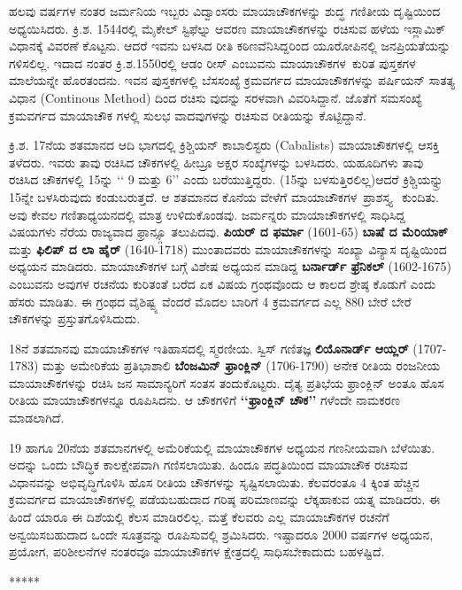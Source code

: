 \medskip
ಹಲವು ವರ್ಷಗಳ ನಂತರ ಜರ್ಮನಿಯ ಇಬ್ಬರು ವಿದ್ವಾಂಸರು ಮಾಯಾಚೌಕಗಳನ್ನು \hbox{ಶುದ್ಧ ಗಣಿತೀಯ} ದೃಷ್ಟಿಯಿಂದ ಅಧ್ಯಯಿಸಿದರು. ಕ್ರಿ.ಶ. 1544ರಲ್ಲಿ ಮೈಕೇಲ್ ಸ್ಟಿಫೆಲ್ನು ಆವರಣ ಮಾಯಾಚೌಕಗಳನ್ನು ರಚಿಸುವ ಹಳೆಯ ಇಸ್ಲಾಮಿಕ್ ವಿಧಾನಕ್ಕೆ ವಿವರಣೆ ಕೊಟ್ಟನು. ಆದರೆ ಇವನು ಬಳಸಿದ ರೀತಿ ಕಠಿಣವೆನಿಸಿದ್ದರಿಂದ ಯೂರೋಪಿನಲ್ಲಿ ಜನಪ್ರಿಯತೆಯನ್ನು ಗಳಿಸ\-ಲಿಲ್ಲ. ಇದಾದ ನಂತರ ಕ್ರಿ.ಶ.1550ರಲ್ಲಿ ಆಡಂ ರೀಸ್ ಎಂಬುವನು \hbox{ಮಾಯಾಚೌಕಗಳ ಕುರಿತ} ಪುಸ್ತಕಗಳ ಮಾಲೆಯನ್ನೇ ಹೊರತಂದನು. ಇವನ ಪುಸ್ತಕಗಳಲ್ಲಿ ಬೆಸಸಂಖ್ಯೆ ಕ್ರಮವರ್ಗದ ಮಾಯಾ\-ಚೌಕಗಳನ್ನು ಪರ್ಷಿಯನ್ ಸಾತತ್ಯ ವಿಧಾನ (Continous Method) ದಿಂದ ರಚಿಸು ವುದನ್ನು ಸರಳವಾಗಿ ವಿವರಿಸಿದ್ದಾನೆ. ಜೊತೆಗೆ ಸಮಸಂಖ್ಯೆ ಕ್ರಮವರ್ಗದ ಮಾಯಾಚೌಕ ಗಳಲ್ಲಿ ಸುಲಭ ವಾದವುಗಳನ್ನು ರಚಿಸುವ ರೀತಿಯನ್ನು ಕೊಟ್ಟಿದ್ದಾನೆ.

ಕ್ರಿ.ಶ. 17ನೆಯ ಶತಮಾನದ ಆದಿ ಭಾಗದಲ್ಲಿ ಕ್ರಿಶ್ಚಿಯನ್ ಕಾಬಾಲಿಸ್ಟರು (Cabalists) ಮಾಯಾಚೌಕಗಳಲ್ಲಿ ಆಸಕ್ತಿ ತಳೆದರು. ಇವರು ತಾವು ರಚಿಸಿದ ಚೌಕಗಳಲ್ಲಿ ಹೀಬ್ರೂ ಅಕ್ಷರ ಸಂಖ್ಯೆಗಳನ್ನು ಬಳಸಿದರು. ಯಹೂದಿಗಳು ತಾವು ರಚಿಸಿದ ಚೌಕಗಳಲ್ಲಿ 15ನ್ನು ‘‘ 9 ಮತ್ತು 6’’ ಎಂದು ಬರೆಯುತ್ತಿದ್ದರು. (15ನ್ನು ಬಳಸುತ್ತಿರಲಿಲ್ಲ)ಆದರೆ ಕ್ರಿಶ್ಚಿಯನ್ನ್ರು 15ನ್ನೇ ಬಳಸಿರುವುದು ಕಂಡುಬರುತ್ತದೆ. ಆ ಶತಮಾನದ ಕೊನೆಯ ವೇಳೆಗೆ \hbox{ಮಾಯಾಚೌಕಗಳ ಪ್ರಾಶಸ್ತ್ಯ } ಕುಂದಿತು. ಅವು ಕೇವಲ ಗಣಿತಾಧ್ಯಯನದಲ್ಲಿ ಮಾತ್ರ ಉಳಿದುಕೊಂಡವು. ಜರ್ಮನ್ನರು ಮಾಯಾಚೌಕಗಳಲ್ಲಿ ಸಾಧಿಸಿದ್ದ ವಿಷಯಗಳು ನೆರೆಯ ರಾಜ್ಯವಾದ ಫ್ರಾನ್ಸ್ಗೂ ತಲುಪಿದವು. \textbf{ಪಿಯರ್ ದ ಫರ್ಮಾ} (1601-65) \textbf{ಬಾಷೆ ದ ಮೆರಿಯಾಕ್} ಮತ್ತು \textbf{ಫಿಲಿಪ್ ದ ಲಾ ಹೈರ್} (1640-1718) ಮುಂತಾದವರು ಮಾಯಾಚೌಕಗಳನ್ನು ಸಂಖ್ಯಾ ವಿನ್ಯಾಸ ದೃಷ್ಟಿಯಿಂದ ಅಧ್ಯಯನ ಮಾಡಿದರು. ಮಾಯಾಚೌಕಗಳ ಬಗ್ಗೆ ವಿಶೇಷ ಅಧ್ಯಯನ ಮಾಡಿದ್ದ \textbf{ಬರ್ನಾರ್ಡ್ ಫ್ರೆನಿಕಲ್} (1602-1675) ಎಂಬುವನು ಅವುಗಳ ರಚನೆಯ ಕುರಿತಂತೆ ಬರೆದ ಏಕ ವಿಷಯ ಗ್ರಂಥವೊಂದು ಆ ಕಾಲದ ಶ್ರೇಷ್ಠ ಕೊಡುಗೆ ಎಂದು ಹೆಸರು ಮಾಡಿತು. ಈ ಗ್ರಂಥದ \hbox{ವೈಶಿಷ್ಟ್ಯ} ವೆಂದರೆ ಮೊದಲ ಬಾರಿಗೆ 4 ಕ್ರಮವರ್ಗದ ಎಲ್ಲ 880 ಬೇರೆ ಬೇರೆ ಚೌಕಗಳನ್ನು ಪ್ರಸ್ತುತ\break ಗೊಳಿಸಿದುದು.

18ನೆ ಶತಮಾನವು ಮಾಯಾಚೌಕಗಳ ಇತಿಹಾಸದಲ್ಲಿ ಸ್ಮರಣೀಯ. ಸ್ವಿಸ್ ಗಣಿತಜ್ಞ \linebreak \textbf{ಲಿಯೊನಾರ್ಡ್ ಆಯ್ಲರ್} (1707-1783) ಮತ್ತು ಅಮೇರಿಕೆಯ ಪ್ರತಿಭಾಶಾಲಿ \textbf{ಬೆಂಜಮಿನ್ ಫ್ರಾಂಕ್ಲಿನ್} (1706-1790) ಅನೇಕ ರೀತಿಯ ರಂಜನೀಯ ಮಾಯಾಚೌಕಗಳನ್ನು ರಚಿಸಿ ಜನ ಸಾಮಾನ್ಯರಿಗೆ ಸಂತಸ ತಂದುಕೊಟ್ಟರು. ದೈತ್ಯ ಪ್ರತಿಭೆಯ ಫ್ರಾಂಕ್ಲಿನ್ ಅಂತೂ ಹೊಸ ರೀತಿಯ ಮಾಯಾಚೌಕಗಳನ್ನೂ ರೂಪಿಸಿದನು. ಆ ಚೌಕಗಳಿಗೆ \textbf{‘‘ಫ್ರಾಂಕ್ಲಿನ್ ಚೌಕ’’} ಗಳೆಂದೇ ನಾಮ\-ಕರಣ ಮಾಡಲಾಗಿದೆ.

19 ಹಾಗೂ 20ನೆಯ ಶತಮಾನಗಳಲ್ಲಿ ಅಮೆರಿಕೆಯಲ್ಲಿ ಮಾಯಾಚೌಕಗಳ ಅಧ್ಯಯನ ಗಣನೀಯವಾಗಿ ಬೆಳೆಯಿತು. ಅದನ್ನು ಒಂದು ಬೌದ್ಧಿಕ ಕಾಲಕ್ಷೇಪವಾಗಿ ಗಣಿಸಲಾಯಿತು. ಹಿಂದೂ ಪದ್ಧತಿಯಿಂದ ಮಾಯಾಚೌಕ ರಚಿಸುವ ವಿಧಾನವನ್ನು ಅಭಿವೃದ್ಧಿಗೊಳಿಸಿ ಹೊಸ ರೀತಿಯ ಚೌಕಗಳನ್ನು ಸೃಷ್ಟಿಸಲಾಯಿತು. ಕೆಲವರಂತೂ 4 ಕ್ಕಿಂತ ಹೆಚ್ಚಿನ ಕ್ರಮವರ್ಗದ ಮಾಯಾಚೌಕಗಳಲ್ಲಿ ಪಡೆಯಬಹುದಾದ ಗರಿಷ್ಠ ಪರಿಮಾಣವನ್ನು ಲೆಕ್ಕಹಾಕುವ ಯತ್ನ ಮಾಡಿದರು. ಈ ಹಿಂದೆ ಯಾರೂ ಈ ದಿಶೆಯಲ್ಲಿ ಕೆಲಸ ಮಾಡಿರಲಿಲ್ಲ. ಮತ್ತೆ ಕೆಲವರು ಎಲ್ಲ ಮಾಯಾಚೌಕಗಳ ರಚನೆಗೆ ಅನ್ವಯಿಸಬಹುದಾದ ಒಂದೇ ಸೂತ್ರವನ್ನು ರೂಪಿಸುವಲ್ಲಿ ಶ್ರಮಿಸಿದರು. \hbox{ಇಷ್ಟಾದರೂ} 2000 ವರ್ಷಗಳ ಅಧ್ಯಯನ, ಪ್ರಯೋಗ, ಪರಿಶೀಲನೆಗಳ ನಂತರವೂ ಮಾಯಾಚೌಕಗಳ \linebreak ಕ್ಷೇತ್ರದಲ್ಲಿ ಸಾಧಿಸಬೇಕಾದುದು ಬಹಳಷ್ಟಿದೆ.
\begin{center}
*****
\end{center}
